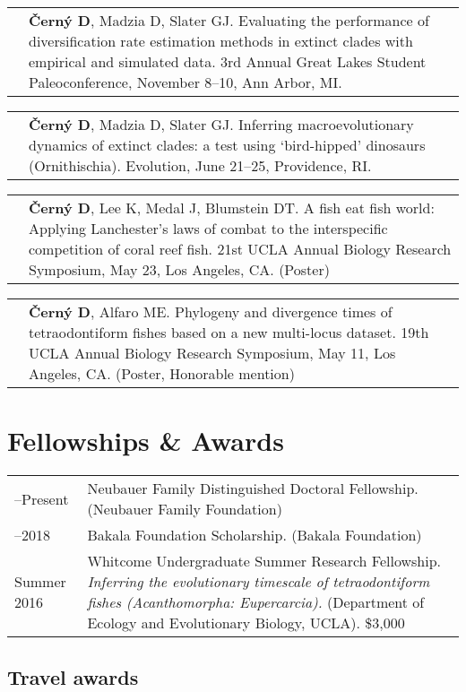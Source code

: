 \documentclass[10pt]{article}
\begin{document}
\begin{tabularx}{\textwidth}{>{\raggedleft\arraybackslash}p{2.2cm} X}
2019 & \textbf{\v{C}ern\'{y} D}, Madzia D, Slater GJ. Evaluating the performance of diversification rate estimation methods in extinct clades with empirical and simulated data. 3rd Annual Great Lakes Student Paleoconference, November 8--10, Ann Arbor, MI.
\end{tabularx}
\begin{tabularx}{\textwidth}{>{\raggedleft\arraybackslash}p{2.2cm} X}
2019 & \textbf{\v{C}ern\'{y} D}, Madzia D, Slater GJ. Inferring macroevolutionary dynamics of extinct clades: a test using `bird-hipped' dinosaurs (Ornithischia). Evolution, June 21--25, Providence, RI.
\end{tabularx}
\begin{tabularx}{\textwidth}{>{\raggedleft\arraybackslash}p{2.2cm} X}
2018 & \textbf{\v{C}ern\'{y} D}, Lee K, Medal J, Blumstein DT. A fish eat fish world: Applying Lanchester's laws of combat to the interspecific competition of coral reef fish. 21st UCLA Annual Biology Research Symposium, May 23, Los Angeles, CA. (Poster)
\end{tabularx}
\begin{tabularx}{\textwidth}{>{\raggedleft\arraybackslash}p{2.2cm} X}
2016 & \textbf{\v{C}ern\'{y} D}, Alfaro ME. Phylogeny and divergence times of tetraodontiform fishes based on a new multi-locus dataset. 19th UCLA Annual Biology Research Symposium, May 11, Los Angeles, CA. (Poster, Honorable mention)
\end{tabularx}

\section*{Fellowships \& Awards}

\begin{tabularx}{\textwidth}{>{\raggedleft\arraybackslash}p{2.2cm} X}
2018--Present & Neubauer Family Distinguished Doctoral Fellowship. (Neubauer Family Foundation) \\[0.1cm]
2014--2018 & Bakala Foundation Scholarship. (Bakala Foundation) \\[0.1cm]
Summer 2016 & Whitcome Undergraduate Summer Research Fellowship. \textit{Inferring the evolutionary timescale of tetraodontiform fishes (Acanthomorpha: Eupercarcia).} (Department of Ecology and Evolutionary Biology, UCLA). \$3,000
\end{tabularx}

\subsection*{Travel awards}
\end{document}
